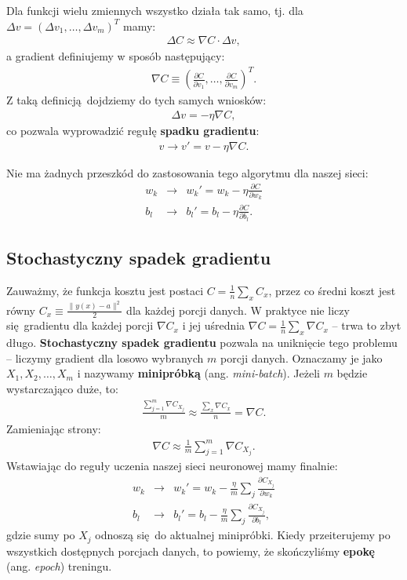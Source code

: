 \documentclass[10pt, oneside]{article}
\theoremstyle{remark}
\begin{document}
Dla funkcji wielu zmiennych wszystko działa tak samo, tj. dla $\Delta v = (\Delta v_1, \ldots, \Delta v_m)^T$ mamy:
\begin{eqnarray} 
  \Delta C \approx \nabla C \cdot \Delta v,
\end{eqnarray}
a gradient definiujemy w sposób następujący:
\begin{eqnarray}
  \nabla C \equiv \left(\frac{\partial C}{\partial v_1}, \ldots, 
  \frac{\partial C}{\partial v_m}\right)^T.
\end{eqnarray}
Z taką definicją dojdziemy do tych samych wniosków:
\begin{eqnarray}
  \Delta v = -\eta \nabla C,
\end{eqnarray}
co pozwala wyprowadzić regułę \textbf{spadku gradientu}:
\begin{eqnarray}
  v \rightarrow v' = v-\eta \nabla C.
\end{eqnarray}

Nie ma żadnych przeszkód do zastosowania tego algorytmu dla naszej sieci:
\begin{eqnarray}
  w_k & \rightarrow & w_k' = w_k-\eta \frac{\partial C}{\partial w_k} \\
  b_l & \rightarrow & b_l' = b_l-\eta \frac{\partial C}{\partial b_l}.
\end{eqnarray}


\subsection{Stochastyczny spadek gradientu}

Zauważmy, że funkcja kosztu jest postaci $C = \frac{1}{n} \sum_x C_x$, przez co średni koszt jest równy $C_x \equiv \frac{\|y(x)-a\|^2}{2}$ dla każdej porcji danych.
W praktyce nie liczy się gradientu dla każdej porcji $\nabla C_x$ i jej uśrednia $\nabla C = \frac{1}{n}\sum_x \nabla C_x$ -- trwa to zbyt długo.
\textbf{Stochastyczny spadek gradientu} pozwala na uniknięcie tego problemu -- liczymy gradient dla losowo wybranych $m$ porcji danych.
Oznaczamy je jako $X_1, X_2, \ldots, X_m$ i nazywamy \textbf{minipróbką} (ang. \emph{mini-batch}).
Jeżeli $m$ będzie wystarczająco duże, to:
\begin{eqnarray}
  \frac{\sum_{j=1}^m \nabla C_{X_{j}}}{m} \approx \frac{\sum_x \nabla C_x}{n} = \nabla C.
\end{eqnarray}
Zamieniając strony:
\begin{eqnarray}
  \nabla C \approx \frac{1}{m} \sum_{j=1}^m \nabla C_{X_{j}}.
\end{eqnarray}
Wstawiając do reguły uczenia naszej sieci neuronowej mamy finalnie:
\begin{eqnarray} 
  w_k & \rightarrow & w_k' = w_k-\frac{\eta}{m}
  \sum_j \frac{\partial C_{X_j}}{\partial w_k} \\
  b_l & \rightarrow & b_l' = b_l-\frac{\eta}{m}
  \sum_j \frac{\partial C_{X_j}}{\partial b_l},
\end{eqnarray}
gdzie sumy po $X_j$ odnoszą się do aktualnej minipróbki.
Kiedy przeiterujemy po wszystkich dostępnych porcjach danych, to powiemy, że skończyliśmy \textbf{epokę} (ang. \emph{epoch}) treningu.
\end{document}
